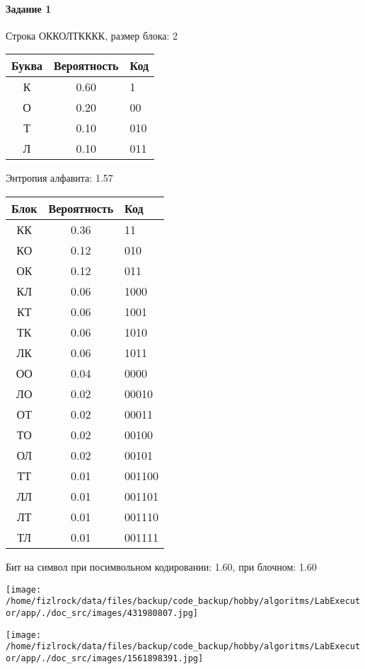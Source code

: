 \documentclass[a4paper, 12pt]{article}
\begin{document}
\paragraph{Задание 1}

Строка ОККОЛТКККК, размер блока: 2
\begin{center}
 \begin{tabular}{ |c|c|l| } 
  \hline
     Буква & Вероятность & Код\\ \hline
К & 0.60 & 1\\\hline
О & 0.20 & 00\\\hline
Т & 0.10 & 010\\\hline
Л & 0.10 & 011
\\ \hline \end{tabular}
\end{center}
Энтропия алфавита: 1.57
\begin{center}
 \begin{tabular}{ |c|c|l| } 
  \hline
     Блок & Вероятность & Код\\ \hline
КК & 0.36 & 11\\\hline
КО & 0.12 & 010\\\hline
ОК & 0.12 & 011\\\hline
КЛ & 0.06 & 1000\\\hline
КТ & 0.06 & 1001\\\hline
ТК & 0.06 & 1010\\\hline
ЛК & 0.06 & 1011\\\hline
ОО & 0.04 & 0000\\\hline
ЛО & 0.02 & 00010\\\hline
ОТ & 0.02 & 00011\\\hline
ТО & 0.02 & 00100\\\hline
ОЛ & 0.02 & 00101\\\hline
ТТ & 0.01 & 001100\\\hline
ЛЛ & 0.01 & 001101\\\hline
ЛТ & 0.01 & 001110\\\hline
ТЛ & 0.01 & 001111
\\ \hline \end{tabular}
\end{center}
Бит на символ при посимвольном кодировании: 1.60, при блочном: 1.60

\texttt{[image: /home/fizlrock/data/files/backup/code\_backup/hobby/algoritms/LabExecutor/app/./doc\_src/images/431980807.jpg]}

\texttt{[image: /home/fizlrock/data/files/backup/code\_backup/hobby/algoritms/LabExecutor/app/./doc\_src/images/1561898391.jpg]}
\pagebreak
\end{document}
